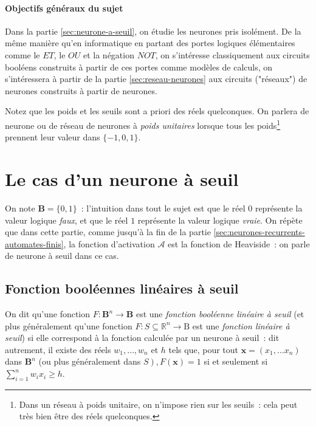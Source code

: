 \documentclass[10pt]{article}
\begin{document}
\paragraph{Objectifs généraux du sujet} Dans la partie \ref{sec:neurone-a-seuil}, on étudie les neurones pris isolément. De la même manière qu'en informatique en partant des portes logiques élémentaires comme le $ET$, le $OU$ et la négation $NOT$, on s'intéresse classiquement aux circuits booléens construits à partir de ces portes comme modèles de calculs, on s'intéressera à partir de la partie \ref{sec:reseau-neurones} aux circuits ("réseaux") de neurones construits à partir de neurones.

Notez que les poids et les seuils sont a priori des réels quelconques. On parlera de neurone ou de réseau de neurones à \emph{poids unitaires} lorsque tous les poids\footnote{Dans un réseau à poids unitaire, on n'impose rien sur les seuils : cela peut très bien être des réels quelconques.} prennent leur valeur dans $\{-1,0,1\}$.

\section{\label{sec:neurone-a-seuil}Le cas d'un neurone à seuil}

On note $\mathbf{B}=\{0,1\}$ : l'intuition dans tout le sujet est que le réel $0$ représente la valeur logique \emph{faux}, et que le réel $1$ représente la valeur logique \emph{vraie}. On répète que dans cette partie, comme jusqu'à la fin de la partie \ref{sec:neurones-recurrents-automates-finis}, la fonction d'activation $\mathcal{A}$ est la fonction de Heaviside : on parle de neurone à seuil dans ce cas.

\subsection{Fonction booléennes linéaires à seuil}

On dit qu'une fonction $F: \mathbf{B}^{n} → \mathbf{B}$ est une \emph{fonction booléenne linéaire à seuil} (et plus généralement qu'une fonction $F: S \subseteq ℝ^{n} → \mathrm{B}$ est une \emph{fonction linéaire à seuil}) si elle correspond à la fonction calculée par un neurone à seuil : dit autrement, il existe des réels $w_{1}, \ldots, w_{n}$ et $h$ tels que, pour tout $\mathbf{x}=\left(x_{1}, \ldots x_{n}\right)$ dans $\mathbf{B}^{n}$ (ou plus généralement dans $\left.S\right), F(\mathbf{x})=1$ si et seulement si $\sum_{i=1}^{n} w_{i} x_{i} ≥ h$.
\end{document}
